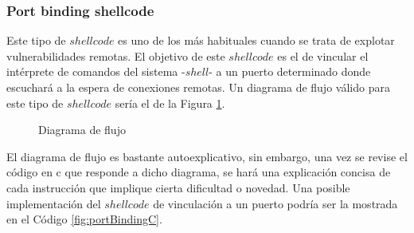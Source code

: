 \documentclass [titlepage, 12pt]{article}
\begin{document}
\subsubsection{Port binding shellcode}

Este tipo de $shellcode$ es uno de los m\'as habituales cuando se trata de explotar vulnerabilidades remotas. El objetivo de este $shellcode$ es el de vincular el int\'erprete de comandos del sistema -$shell$- a un puerto determinado donde escuchar\'a a la espera de conexiones remotas. Un diagrama de flujo v\'alido para este tipo de $shellcode$ ser\'ia el de la Figura \ref{fig:diagramaFlujo}.\bigskip

\begin{figure}[!hbp]
	\caption{Diagrama de flujo}
    \label{fig:diagramaFlujo}  
    \centering
    \addtolength{\abovecaptionskip}{-12pt}    
\end{figure}

El diagrama de flujo es bastante autoexplicativo, sin embargo, una vez se revise el c\'odigo en c que responde a dicho diagrama, se har\'a una explicaci\'on concisa de cada instrucci\'on que implique cierta dificultad o novedad. Una posible implementaci\'on del $shellcode$ de vinculaci\'on a un puerto podr\'ia ser la mostrada en el C\'odigo \ref{fig:portBindingC}.
\end{document}

